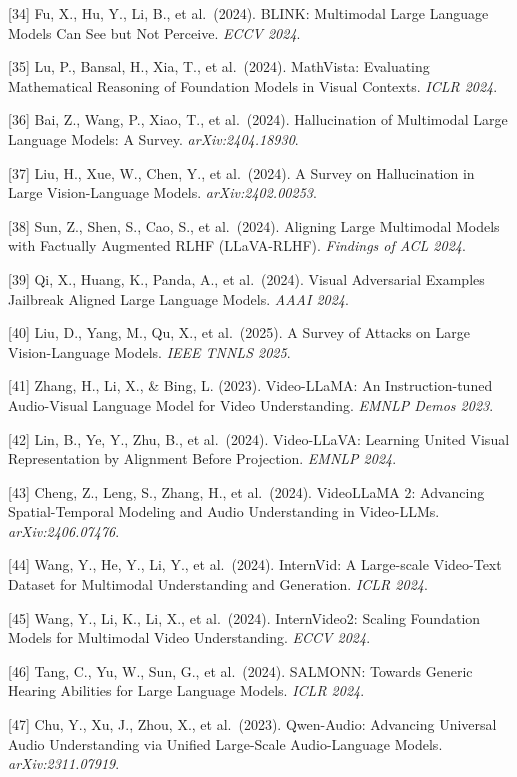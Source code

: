 {[}34{]} Fu, X., Hu, Y., Li, B., et al.~(2024). BLINK: Multimodal Large Language Models Can See but Not Perceive. \emph{ECCV 2024}.

{[}35{]} Lu, P., Bansal, H., Xia, T., et al.~(2024). MathVista: Evaluating Mathematical Reasoning of Foundation Models in Visual Contexts. \emph{ICLR 2024}.

{[}36{]} Bai, Z., Wang, P., Xiao, T., et al.~(2024). Hallucination of Multimodal Large Language Models: A Survey. \emph{arXiv:2404.18930}.

{[}37{]} Liu, H., Xue, W., Chen, Y., et al.~(2024). A Survey on Hallucination in Large Vision-Language Models. \emph{arXiv:2402.00253}.

{[}38{]} Sun, Z., Shen, S., Cao, S., et al.~(2024). Aligning Large Multimodal Models with Factually Augmented RLHF (LLaVA-RLHF). \emph{Findings of ACL 2024}.

{[}39{]} Qi, X., Huang, K., Panda, A., et al.~(2024). Visual Adversarial Examples Jailbreak Aligned Large Language Models. \emph{AAAI 2024}.

{[}40{]} Liu, D., Yang, M., Qu, X., et al.~(2025). A Survey of Attacks on Large Vision-Language Models. \emph{IEEE TNNLS 2025}.

{[}41{]} Zhang, H., Li, X., \& Bing, L. (2023). Video-LLaMA: An Instruction-tuned Audio-Visual Language Model for Video Understanding. \emph{EMNLP Demos 2023}.

{[}42{]} Lin, B., Ye, Y., Zhu, B., et al.~(2024). Video-LLaVA: Learning United Visual Representation by Alignment Before Projection. \emph{EMNLP 2024}.

{[}43{]} Cheng, Z., Leng, S., Zhang, H., et al.~(2024). VideoLLaMA 2: Advancing Spatial-Temporal Modeling and Audio Understanding in Video-LLMs. \emph{arXiv:2406.07476}.

{[}44{]} Wang, Y., He, Y., Li, Y., et al.~(2024). InternVid: A Large-scale Video-Text Dataset for Multimodal Understanding and Generation. \emph{ICLR 2024}.

{[}45{]} Wang, Y., Li, K., Li, X., et al.~(2024). InternVideo2: Scaling Foundation Models for Multimodal Video Understanding. \emph{ECCV 2024}.

{[}46{]} Tang, C., Yu, W., Sun, G., et al.~(2024). SALMONN: Towards Generic Hearing Abilities for Large Language Models. \emph{ICLR 2024}.

{[}47{]} Chu, Y., Xu, J., Zhou, X., et al.~(2023). Qwen-Audio: Advancing Universal Audio Understanding via Unified Large-Scale Audio-Language Models. \emph{arXiv:2311.07919}.

